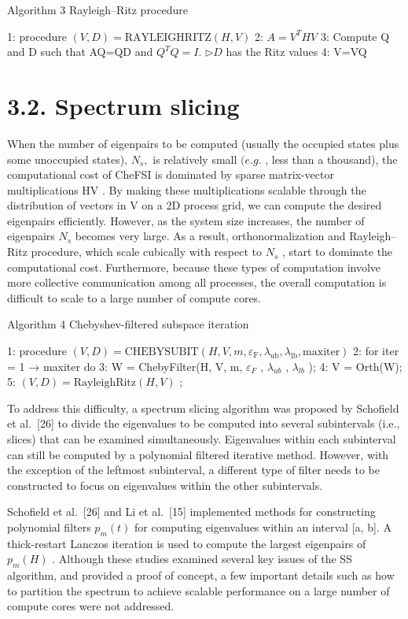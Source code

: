 \documentclass[
  10
]{article}
\begin{document}
Algorithm 3 Rayleigh--Ritz procedure

1: procedure \((V,D)=\text{RAYLEIGHRITZ}(H,V)\) 2: \(A=V^{T}HV\) 3:
Compute Q and D such that AQ=QD and \(Q^{T}Q=I.\) \(\triangleright D\)
has the Ritz values 4: V=VQ

\section{3.2. Spectrum slicing}\label{spectrum-slicing}

When the number of eigenpairs to be computed (usually the occupied
states plus some unoccupied states), \(N _ { s } ,\) is relatively small
\(( e . g .\) , less than a thousand), the computational cost of CheFSI
is dominated by sparse matrix-vector multiplications HV . By making
these multiplications scalable through the distribution of vectors in V
on a 2D process grid, we can compute the desired eigenpairs efficiently.
However, as the system size increases, the number of eigenpairs
\(N _ { s }\) becomes very large. As a result, orthonormalization and
Rayleigh--Ritz procedure, which scale cubically with respect to
\(N _ { s }\) , start to dominate the computational cost. Furthermore,
because these types of computation involve more collective communication
among all processes, the overall computation is difficult to scale to a
large number of compute cores.

Algorithm 4 Chebyshev-filtered subspace iteration

1: procedure
\((V,D)=\text{CHEBYSUBIT}(H,V,m,\varepsilon_{\mathrm{F}},\lambda_{\mathrm{ub}},\lambda_{\mathrm{lb}},\text{maxiter})\)
2: for iter = 1 → maxiter do 3: W = ChebyFilter(H, V, m,
\(\varepsilon_{F}\) , \(\lambda_{ub}\) , \(\lambda_{lb}\) ); 4: V =
Orth(W); 5: \((V,D)=\text{RayleighRitz}(H,V)\) ;

To address this difficulty, a spectrum slicing algorithm was proposed by
Schofield et al.~{[}26{]} to divide the eigenvalues to be computed into
several subintervals (i.e., slices) that can be examined simultaneously.
Eigenvalues within each subinterval can still be computed by a
polynomial filtered iterative method. However, with the exception of the
leftmost subinterval, a different type of filter needs to be constructed
to focus on eigenvalues within the other subintervals.

Schofield et al.~{[}26{]} and Li et al.~{[}15{]} implemented methods for
constructing polynomial filters \(p _ { m } ( t )\) for computing
eigenvalues within an interval {[}a, b{]}. A thick-restart Lanczos
iteration is used to compute the largest eigenpairs of
\(p _ { m } ( H )\) . Although these studies examined several key issues
of the SS algorithm, and provided a proof of concept, a few important
details such as how to partition the spectrum to achieve scalable
performance on a large number of compute cores were not addressed.
\end{document}
